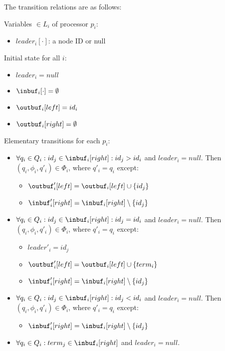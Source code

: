The transition relations are as follows:

Variables $\in L_i$ of processor $p_i$:
\begin{itemize}
\item $leader_i[\cdot]$: a node ID or null
\end{itemize}

Initial state for all $i$:
\begin{itemize}
\item $leader_i = null$
\item $\inbuf_i[\cdot] = \emptyset$
\item $\outbuf_i[left] = id_i$
\item $\outbuf_i[right] = \emptyset$
\end{itemize}

Elementary transitions for each $p_i$:
\begin{itemize}
\item $\forall q_i \in Q_i: id_j \in \inbuf_i[right]: id_j > id_i$ and $leader_i = null$.
      Then $(q_i, \phi_i, q'_i) \in \Phi_i$,
      where $q'_i = q_i$ except:
      \begin{itemize}
      \item $\outbuf'_i[left] = \outbuf_i[left] \cup \{id_j\}$
      \item $\inbuf'_i[right] = \inbuf_i[right] \setminus \{id_j\}$
      \end{itemize}
\item $\forall q_i \in Q_i: id_j \in \inbuf_i[right]: id_j = id_i$ and $leader_i = null$.
      Then $(q_i, \phi_i, q'_i) \in \Phi_i$,
      where $q'_i = q_i$ except:
      \begin{itemize}
      \item $leader'_i = id_j$
      \item $\outbuf'_i[left] = \outbuf_i[left] \cup \{term_i\}$
      \item $\inbuf'_i[right] = \inbuf_i[right] \setminus \{id_j\}$
      \end{itemize}
\item $\forall q_i \in Q_i: id_j \in \inbuf_i[right]: id_j < id_i$ and $leader_i = null$.
      Then $(q_i, \phi_i, q'_i) \in \Phi_i$,
      where $q'_i = q_i$ except:
      \begin{itemize}
      \item $\inbuf'_i[right] = \inbuf_i[right] \setminus \{id_j\}$
      \end{itemize}
\item $\forall q_i \in Q_i: term_j \in \inbuf_i[right]$ and $leader_i = null$.

\end{itemize}
